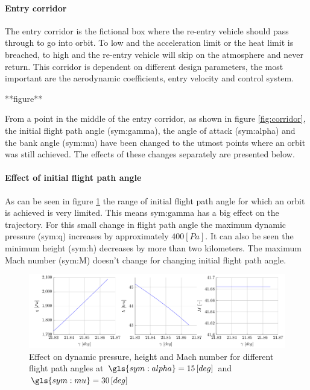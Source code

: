 \paragraph{Entry corridor}

The entry corridor is the fictional box where the re-entry vehicle should pass through to go into orbit. To low and the acceleration limit or the heat limit is breached, to high and the re-entry vehicle will skip on the atmosphere and never return. This corridor is dependent on different design parameters, the most important are the aerodynamic coefficients, entry velocity and control system.

**figure**

From a point in the middle of the entry corridor, as shown in figure \ref{fig:corridor}, the initial flight path angle (\gls{sym:gamma}), the angle of attack (\gls{sym:alpha}) and the bank angle (\gls{sym:mu}) have been changed to the utmost points where an orbit was still achieved. The effects of these changes separately are presented below.

\paragraph{Effect of initial flight path angle}

As can be seen in figure \ref{fig:effectgamma} the range of initial flight path angle for which an orbit is achieved is very limited. This means \gls{sym:gamma} has a big effect on the trajectory. For this small change in flight path angle the maximum dynamic pressure (\gls{sym:q}) increases by approximately $400 \left[Pa\right]$. It can also be seen the minimum height (\gls{sym:h}) decreases by more than two kilometers. The maximum Mach number (\gls{sym:M}) doesn't change for changing initial flight path angle.
\begin{figure}[H]
	\centering
	\includegraphics[width=\textwidth]{./Figure/orbit/effectgamma.pdf}
	\caption{Effect on dynamic pressure, height and Mach number for different flight path angles at $\gls{sym:alpha}=15 \left[deg\right]$ and $\gls{sym:mu}=30 \left[deg\right]$}
	\label{fig:effectgamma}
\end{figure}

